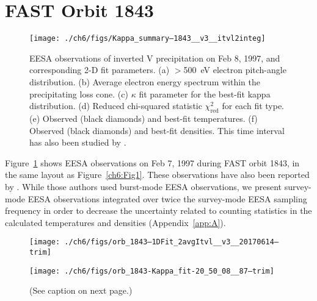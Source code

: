   \section{FAST Orbit 1843}


  \begin{figure}
    \centering
    \noindent\texttt{[image: ./ch6/figs/Kappa\_summary--1843\_\_v3\_\_itvl2integ]}
    \caption[Inverted V precipitation and best-fit Maxwellian and kappa
    distribution parameters (Orbit 1843)]{EESA observations of inverted V
      precipitation on Feb 8, 1997, and corresponding 2-D fit parameters. (a)
      $>$500~eV electron pitch-angle distribution. (b) Average electron energy spectrum
      within the precipitating loss cone. (c) $\kappa$ fit parameter for the
      best-fit kappa distribution. (d) Reduced chi-squared statistic
      $\chi^2_{\mathrm{red}}$ for each fit type. (e) Observed (black diamonds)
      and best-fit temperatures. (f) Observed (black diamonds) and best-fit
      densities. This time interval has also been studied by
      \citet{Ergun1998a,Ergun1998}.}
    \label{ch6:Fig4}
  \end{figure}


  Figure~\ref{ch6:Fig4} shows EESA observations on Feb 7, 1997 during FAST orbit
  1843, in the same layout as Figure~\ref{ch6:Fig1}. These observations have
  also been reported by \citet{Ergun1998a,Ergun1998}. While those authors used
  burst-mode EESA observations, we present survey-mode EESA observations
  integrated over twice the survey-mode EESA sampling frequency in order
  to decrease the uncertainty related to counting statistics in the calculated
  temperatures and densities (Appendix~\ref{app:A}).


  \begin{figure}
    \centering



    \noindent\texttt{[image: ./ch6/figs/orb\_1843--1DFit\_2avgItvl\_\_v3\_\_20170614--trim]}

    \vspace{1cm}

    \noindent\texttt{[image: ./ch6/figs/orb\_1843-Kappa\_fit-20\_50\_08\_\_87--trim]}

    \caption[Example one- and two-dimensional fits of observed inverted-V
    electron distributions (Orbit 1843)]{(See caption on next page.)}

    \label{ch6:Fig5}
  \end{figure}

